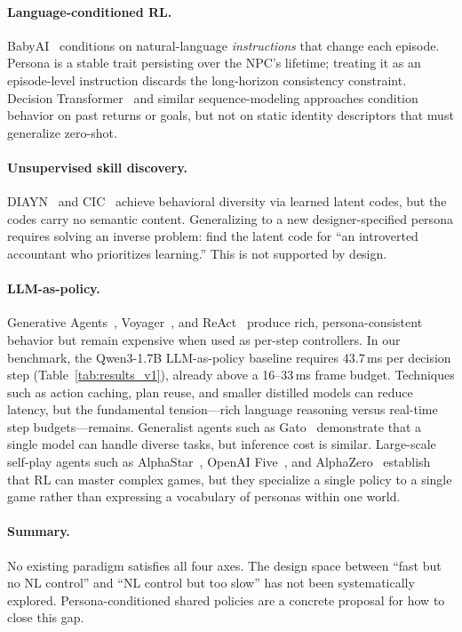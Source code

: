 \documentclass[conference]{IEEEtran}
\begin{document}
\paragraph{Language-conditioned RL.}
BabyAI~\cite{chevalier2019babyai} conditions on natural-language
\emph{instructions} that change each episode.
Persona is a stable trait persisting over the NPC's lifetime; treating it as an
episode-level instruction discards the long-horizon consistency constraint.
Decision Transformer~\cite{chen2021decision} and similar sequence-modeling
approaches condition behavior on past returns or goals, but not on static identity
descriptors that must generalize zero-shot.

\paragraph{Unsupervised skill discovery.}
DIAYN~\cite{eysenbach2018diayn} and CIC~\cite{laskin2022cic} achieve behavioral
diversity via learned latent codes, but the codes carry no semantic content.
Generalizing to a new designer-specified persona requires solving an inverse
problem: find the latent code for ``an introverted accountant who prioritizes
learning.'' This is not supported by design.

\paragraph{LLM-as-policy.}
Generative Agents~\cite{park2023generative}, Voyager~\cite{wang2023voyager},
and ReAct~\cite{yao2023react} produce rich, persona-consistent behavior but
remain expensive when used as per-step controllers. In our benchmark, the
Qwen3-1.7B LLM-as-policy baseline requires 43.7\,ms per decision step
(Table~\ref{tab:results_v1}), already above a 16--33\,ms frame budget.
Techniques such as action caching, plan reuse, and smaller distilled models can
reduce latency, but the fundamental tension---rich language reasoning versus
real-time step budgets---remains. Generalist agents such as
Gato~\cite{reed2022gato} demonstrate that a single model can handle diverse
tasks, but inference cost is similar. Large-scale self-play agents such as
AlphaStar~\cite{vinyals2019alphastar}, OpenAI Five~\cite{berner2019dota},
and AlphaZero~\cite{silver2018alphazero} establish that RL can master complex
games, but they specialize a single policy to a single game rather than
expressing a vocabulary of personas within one world.

\paragraph{Summary.}
No existing paradigm satisfies all four axes. The design space between
``fast but no NL control'' and ``NL control but too slow'' has not been
systematically explored. Persona-conditioned shared policies are a concrete
proposal for how to close this gap.
\end{document}
